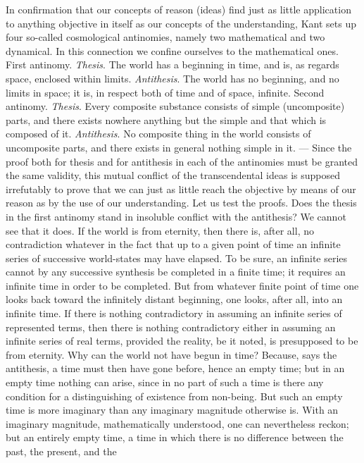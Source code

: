 \documentclass[12pt]{article}
\begin{document}
In confirmation that our concepts of reason (ideas) find just as little
application to anything objective in itself as our concepts of the
understanding, Kant sets up four so-called cosmological antinomies, namely
two mathematical and two dynamical. In this connection we confine ourselves
to the mathematical ones. First antinomy. \emph{Thesis}. The world has a
beginning in time, and is, as regards space, enclosed within limits.
\emph{Antithesis}. The world has no beginning, and no limits in space; it
is, in respect both of time and of space, infinite. Second antinomy.
\emph{Thesis}. Every composite substance consists of simple (uncomposite)
parts, and there exists nowhere anything but the simple and that which is
composed of it. \emph{Antithesis}. No composite thing in the world consists
of uncomposite parts, and there exists in general nothing simple in it.
--- Since the proof both for thesis and for antithesis in each of the
antinomies must be granted the same validity, this mutual conflict of the
transcendental ideas is supposed irrefutably to prove that we can just as
little reach the objective by means of our reason as by the use of our
understanding. Let us test the proofs. Does the thesis in the first
antinomy stand in insoluble conflict with the antithesis? We cannot see
that it does. If the world is from eternity, then there is, after all, no
contradiction whatever in the fact that up to a given point of time an
infinite series of successive world-states may have elapsed. To be sure, an
infinite series cannot by any successive synthesis
be completed in a finite time; it requires an infinite time in order to be
completed. But from whatever finite point of time one looks back toward the
infinitely distant beginning, one looks, after all, into an infinite time.
If there is nothing contradictory in assuming an infinite series of
represented terms, then there is nothing contradictory either in assuming
an infinite series of real terms, provided the reality, be it noted, is
presupposed to be from eternity. Why can the world not have begun in time?
Because, says the antithesis, a time must then have gone before, hence an
empty time; but in an empty time nothing can arise, since in no part of
such a time is there any condition for a distinguishing of existence from
non-being. But such an empty time is more imaginary than any imaginary
magnitude otherwise is. With an imaginary magnitude, mathematically
understood, one can nevertheless reckon; but an entirely empty time, a time
in which there is no difference between the past, the present, and the
\end{document}
